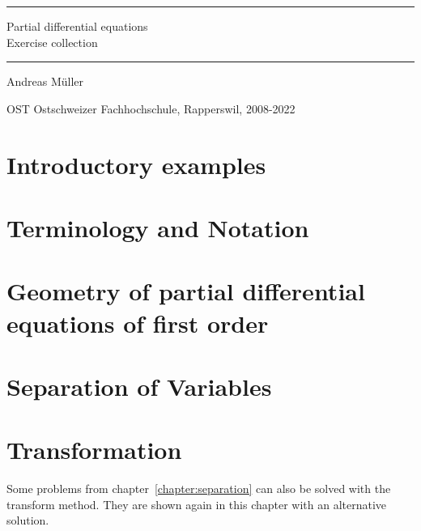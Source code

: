\documentclass[a4paper,12pt]{book}
\begin{document}
\pagestyle{fancy}
\rhead{}
\frontmatter
\newcommand\HRule{\noindent\rule{\linewidth}{1.5pt}}
\begin{titlepage}
\HRule
\vspace*{2pt}
\begin{flushright}
{\Huge
Partial differential equations\\
\bigskip
Exercise collection}
\end{flushright}
\HRule
\begin{flushright}
\vspace{30pt}
\LARGE
Andreas Müller
\end{flushright}
\begin{center}
OST Ostschweizer Fachhochschule, Rapperswil, 2008-2022
\end{center}
\end{titlepage}
\hypersetup{
	colorlinks=true,
	linktoc=all,
	linkcolor=blue
}
\tableofcontents
\newenvironment{beispiel}[1][Example]{%
\begin{proof}[#1]%
\renewcommand{\qedsymbol}{$\bigcirc$}
}{\end{proof}}
\mainmatter


\chapter{Introductory examples}

\chapter{Terminology and Notation}

\chapter{Geometry of partial differential equations of first order
\label{chapter:separation}}

\chapter{Separation of Variables\label{chapter:separation}}

\chapter{Transformation}
Some problems from chapter~\ref{chapter:separation}
can also be solved with the transform method.
They are shown again in this chapter with an alternative solution.
\bigskip
\end{document}
